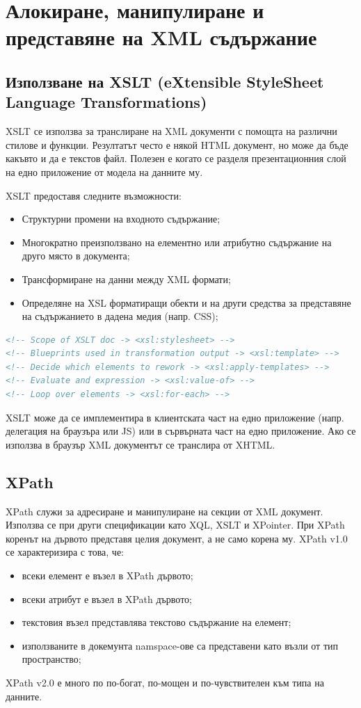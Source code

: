 \documentclass[fleqn,12pt]{article}
\begin{document}
\section{Алокиране, манипулиране и представяне на XML съдържание}

\subsection{Използване на XSLT (eXtensible StyleSheet Language Transformations)}

XSLT се използва за транслиране на XML документи с помощта на различни стилове и функции.
Резултатът често е някой HTML документ, но може да бъде какъвто и да е текстов файл.
Полезен е когато се разделя презентационния слой на едно приложение от модела на данните му.

XSLT предоставя следните възможности:
\begin{itemize}
    \item Структурни промени на входното съдържание;
    \item Многократно преизползвано на елементно или атрибутно съдържание на друго място в документа;
    \item Трансформиране на данни между XML формати;
    \item Определяне на XSL форматиращи обекти и на други средства за представяне на съдържанието в дадена медия (напр. CSS);
\end{itemize}

\begin{lstlisting}[language=XML, caption=XSLT elements]
<!-- Scope of XSLT doc -> <xsl:stylesheet> -->
<!-- Blueprints used in transformation output -> <xsl:template> -->
<!-- Decide which elements to rework -> <xsl:apply-templates> -->
<!-- Evaluate and expression -> <xsl:value-of> -->
<!-- Loop over elements -> <xsl:for-each> -->
\end{lstlisting}

XSLT може да се имплементира в клиентската част на едно приложение (напр. делегация на браузъра или JS) или в сървърната част на едно приложение.
Ако се използва в браузър XML документът се транслира от XHTML.

\subsection{XPath}

XPath служи за адресиране и манипулиране на секции от XML документ.
Използва се при други спецификации като XQL, XSLT и XPointer.
\bigbreak
При XPath коренът на дървото представя целия документ, а не само корена му.
XPath v1.0 се характеризира с това, че:
\begin{itemize}
    \item всеки елемент е възел в XPath дървото;
    \item всеки атрибут е възел в XPath дървото;
    \item текстовия възел представлява текстово съдържание на елемент;
    \item използваните в докемунта namspace-ове са представени като възли от тип пространство;
\end{itemize}
XPath v2.0 е много по по-богат, по-мощен и по-чувствителен към типа на данните.
\end{document}
